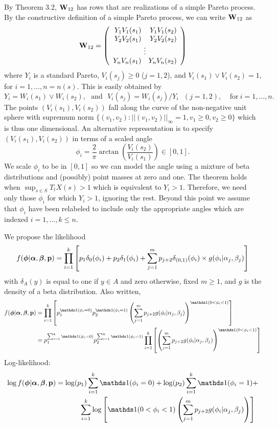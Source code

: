 By Theorem 3.2, $\mathbf{\bm{W}}_{12}$ has rows that are realizations of a simple Pareto process. By the constructive definition of a simple Pareto process, we can write $\mathbf{\bm{W}}_{12}$ as
\[ \m{W}_{12} = \left(\begin{array}{rr} Y_1V_1(s_1) & Y_1V_1(s_2) \\ Y_2V_2(s_1) & Y_2V_2(s_2) \\ \multicolumn{2}{c}{\vdots} \\ Y_nV_n(s_1) & Y_nV_n(s_2) \end{array}\right) \]
where $Y_i$ is a standard Pareto, $V_i(s_j)\geq 0$ ($j=1,2$), and $V_i(s_1) \vee V_i(s_2) = 1$, for $i=1,\ldots,n=n(s)$. This is easily obtained by
\[ Y_i = W_i(s_1) \vee W_i(s_2),~~~\mathrm{and}~~~ V_i(s_j) = W_i(s_j) / Y_i ~~~ (j=1,2),~~~~~\mathrm{for~}i=1,\ldots,n. \]
The points $(V_i(s_1), V_i(s_2))$ fall along the curve of the non-negative unit sphere with supremum norm $\{(v_1, v_2):||(v_1,v_2)||_\infty=1, v_1\geq0,v_2\geq0\}$ which is thus one dimensional. An alternative representation is to specify $(V_i(s_1), V_i(s_2))$ in terms of a scaled angle
\[ \phi_i = \frac{2}{\pi}\arctan\left(\frac{V_i(s_2)}{V_i(s_1)}\right)\in[0,1]. \]
We scale $\phi_i$ to be in $[0,1]$ so we can model the angle using a mixture of beta distributions and (possibly) point masses at zero and one. The theorem holds when $\sup_{s\in S}T_t X(s) > 1$ which is equivalent to $Y_i > 1$. Therefore, we need only those $\phi_i$ for which $Y_i>1$, ignoring the rest. Beyond this point we assume that $\phi_i$ have been relabeled to include only the appropriate angles which are indexed $i=1,\ldots,k\leq n$.

We propose the likelihood
\[ f(\mathbf{\bm{\phi}}|\mathbf{\bm{\alpha}},\mathbf{\bm{\beta}},\mathbf{\bm{p}}) = \prod_{i=1}^k\left[p_1 \delta_0(\phi_i) + p_2 \delta_1(\phi_i) + \sum_{j=1}^m p_{j+2} \delta_{(0,1)}(\phi_i)\times g(\phi_i|\alpha_j, \beta_j) \right] \]
with $\delta_A(y)$ is equal to one if $y\in A$ and zero otherwise, fixed $m\geq 1$, and $g$ is the density of a beta distribution. Also written,
\begin{align*}
f(\m{\phi}|\m{\alpha},\m{\beta},\m{p}) &= \prod_{i=1}^k\left[p_1^{\ind(\phi_i=0)}p_2^{\ind(\phi_i=1)}\left(\sum_{j=1}^m p_{j+2}g(\phi_i|\alpha_j, \beta_j)\right)^{\ind(0<\phi_i<1)} \right] \\
 &= p_1^{\sum_{i=1}^k\ind(\phi_i=0)}p_2^{\sum_{i=1}^k\ind(\phi_i=1)}\prod_{i=1}^k\left[\left(\sum_{j=1}^m p_{j+2}g(\phi_i|\alpha_j, \beta_j)\right)^{\ind(0<\phi_i<1)} \right]
\end{align*}
Log-likelihood:
\begin{align*}
\log f(\m{\phi}|\m{\alpha},\m{\beta},\m{p}) &= \log(p_1)\sum_{i=1}^k\ind(\phi_i=0)+\log(p_2)\sum_{i=1}^k\ind(\phi_i=1)+ \\
 & ~~~~~ ~~~~~ \sum_{i=1}^k\log\left[\ind(0<\phi_i<1)\left(\sum_{j=1}^m p_{j+2}g(\phi_i|\alpha_j, \beta_j)\right) \right]
\end{align*}


